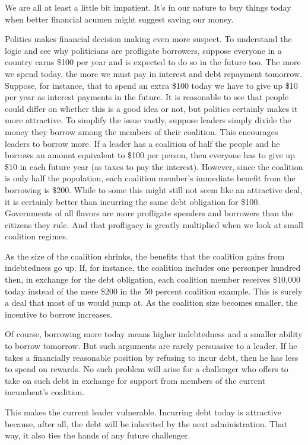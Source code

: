 \documentclass[10pt]{article}
\begin{document}
{\large We are all at least a little bit impatient. It's in our nature to buy
things today when better financial acumen might suggest saving our money.}

{\large Politics makes financial decision making even more suspect. To
understand the logic and see why politicians are profligate borrowers, suppose
everyone in a country earns \$100 per year and is expected to do so in the future
too. The more we spend today, the more we must pay in interest and debt repayment
tomorrow. Suppose, for instance, that to spend an extra \$100 today we have to
give up \$10 per year as interest payments in the future. It is reasonable to see
that people could differ on whether this is a good idea or not, but politics
certainly makes it more attractive. To simplify the issue vastly, suppose leaders
simply divide the money they borrow among the members of their coalition. This
encourages leaders to borrow more. If a leader has a coalition of half the people
and he borrows an amount equivalent to \$100 per person, then everyone has to
give up \$10 in each future year (as taxes to pay the interest). However, since
the coalition is only half the population, each coalition member's immediate
benefit from the borrowing is \$200. While to some this might still not seem like
an attractive deal, it is certainly better than incurring the same debt
obligation for \$100. Governments of all flavors are more profligate spenders and
borrowers than the citizens they rule. And that profligacy is greatly multiplied
when we look at small coalition regimes.}

{\large As the size of the coalition shrinks, the benefits that the coalition
gains from indebtedness go up. If, for instance, the coalition includes one
personper hundred then, in exchange for the debt obligation, each coalition
member receives \$10,000 today instead of the mere \$200 in the 50 percent
coalition example. This is surely a deal that most of us would jump at. As the
coalition size becomes smaller, the incentive to borrow increases.}

{\large Of course, borrowing more today means higher indebtedness and a smaller
ability to borrow tomorrow. But such arguments are rarely persuasive to a leader.
If he takes a financially reasonable position by refusing to incur debt, then he
has less to spend on rewards. No such problem will arise for a challenger who
offers to take on such debt in exchange for support from members of the current
incumbent's coalition.}

{\large This makes the current leader vulnerable. Incurring debt today is
attractive because, after all, the debt will be inherited by the next
administration. That way, it also ties the hands of any future challenger.}
\end{document}

